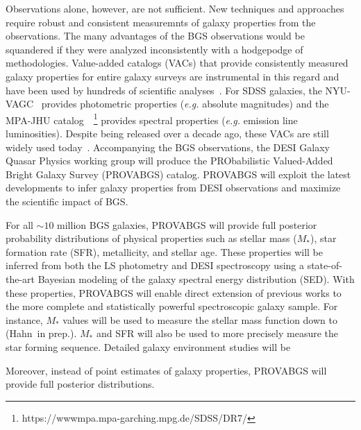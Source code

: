 Observations alone, however, are not sufficient.  
New techniques and approaches require robust and consistent measuremnts of
galaxy properties from the observations.
The many advantages of the BGS observations would be squandered if they were 
analyzed inconsistently with a hodgepodge of methodologies.  
Value-added catalogs (VACs) that provide consistently measured galaxy
properties for entire galaxy surveys are instrumental in this regard and have
been used by hundreds of scientific
analyses~\citep[see][for a review]{blanton2009}. 
For SDSS galaxies, the NYU-VAGC~\citep{blanton2005} provides photometric properties
(\emph{e.g.} absolute magnitudes) and the MPA-JHU
catalog~~\citep{brinchmann2004}\footnote{https://wwwmpa.mpa-garching.mpg.de/SDSS/DR7/}
provides spectral properties (\emph{e.g.} emission line
luminosities).
Despite being released over a decade ago, these VACs are still widely used
today~\citep[\emph{e.g.}][]{alpaslan2021, odonnell2021, trevisan2021}. 
Accompanying the BGS observations, the DESI Galaxy Quasar Physics working group
will produce the PRObabilistic Valued-Added Bright Galaxy Survey (PROVABGS)
catalog. 
PROVABGS will exploit the latest developments to infer galaxy properties from
DESI observations and maximize the scientific impact of BGS. 

For all ${\sim}10$ million BGS galaxies, PROVABGS will provide full posterior
probability distributions of physical properties such as stellar mass ($M_*$),
star formation rate (SFR), metallicity, and stellar age. 
These properties will be inferred from both the LS photometry and DESI
spectroscopy using a state-of-the-art Bayesian modeling of the galaxy spectral
energy distribution (SED). 
With these properties, PROVABGS will enable direct extension of previous works
to the more complete and statistically powerful spectroscopic galaxy sample. 
For instance, $M_*$ values will be used to measure the stellar mass function
down to  (Hahn\etal~in prep.). 
$M_*$ and SFR will also be used to more precisely measure the star forming
sequence.
Detailed galaxy environment studies will be 

Moreover, instead of point estimates of galaxy properties, PROVABGS will
provide full posterior distributions. 


